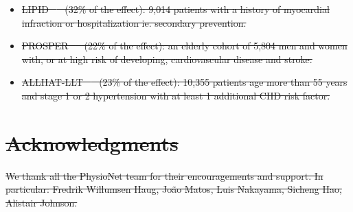 \documentclass[10pt,letterpaper]{article}
\providecommand{\DIFdeltex}[1]{{\protect\color{red}\sout{#1}}}                      %
\providecommand{\DIFdelbegin}{} %
\providecommand{\DIFdelend}{} %
\providecommand{\DIFdel}[1]{\texorpdfstring{\DIFdeltex{#1}}{}} %
\newcommand{\DIFscaledelfig}{0.5}
\newlength{\DIFdelgraphicswidth} %
\newlength{\DIFdelgraphicsheight} %
\newcommand{\DIFdelincludegraphics}[2][]{%
\sbox{\DIFdelgraphicsbox}{\DIFOincludegraphics[#1]{#2}}%
\settoboxwidth{\DIFdelgraphicswidth}{\DIFdelgraphicsbox} %
\settoboxtotalheight{\DIFdelgraphicsheight}{\DIFdelgraphicsbox} %
\scalebox{\DIFscaledelfig}{%
\parbox[b]{\DIFdelgraphicswidth}{\usebox{\DIFdelgraphicsbox}\\[-\baselineskip] \rule{\DIFdelgraphicswidth}{0em}}\llap{\resizebox{\DIFdelgraphicswidth}{\DIFdelgraphicsheight}{%
\setlength{\unitlength}{\DIFdelgraphicswidth}%
\begin{picture}(1,1)%
\thicklines\linethickness{2pt} %
{\color[rgb]{1,0,0}\put(0,0){\framebox(1,1){}}}%
{\color[rgb]{1,0,0}\put(0,0){\line( 1,1){1}}}%
{\color[rgb]{1,0,0}\put(0,1){\line(1,-1){1}}}%
\end{picture}%
}\hspace*{3pt}}} %
} %
\DeclareRobustCommand{\DIFdelbegin}{\DIFOdelbegin \let\includegraphics\DIFdelincludegraphics} %
\DeclareRobustCommand{\DIFdelend}{\DIFOaddend \let\includegraphics\DIFOincludegraphics} %
\begin{document}
\DIFdelbegin %
\begin{itemize}%
  \item%
        \DIFdel{LIPID \mbox{%
            \cite{long1998prevention} }\hskip0pt%
          (32\% of the effect): 9,014 patients with a history of
          myocardial infraction or hospitalization ie. secondary prevention.
        }%
  \item%
        \DIFdel{PROSPER \mbox{%
            \cite{shepherd2002pravastatin} }\hskip0pt%
          (22\% of the effect): an elderly cohort of
          5,804 men and women with, or at high risk of developing, cardiovascular
          disease and stroke.
        }%
  \item%
        \DIFdel{ALLHAT-LLT \mbox{%
            \cite{antihypertensive2002major} }\hskip0pt%
          (23\% of the effect): 10,355 patients age more than 55
          years and stage 1 or 2 hypertension with at least 1 additional CHD risk
          factor.
        }
\end{itemize}%
\DIFdelend %

\DIFdelbegin \section*{\DIFdel{Acknowledgments}}
\DIFdelend %

\DIFdelbegin \DIFdel{We thank all the PhysioNet team for their encouragements and support. In
  particular: Fredrik Willumsen Haug, João Matos, Luis Nakayama, Sicheng Hao, Alistair Johnson.
}\DIFdelend %
\end{document}
